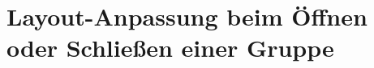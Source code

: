 \documentclass[a4paper, oneside]{scrartcl}
\begin{document}


		
							



\section{Layout-Anpassung beim Öffnen oder Schließen einer Gruppe}
\end{document}
